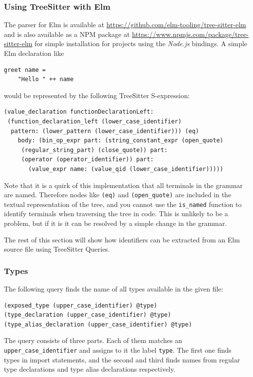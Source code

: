 \documentclass[../thesis.tex]{subfiles}
\begin{document}
\subsubsection{Using TreeSitter with Elm}
The parser for Elm is available at \url{https://github.com/elm-tooling/tree-sitter-elm}
and is also available as a NPM package at \url{https://www.npmjs.com/package/tree-sitter-elm} for simple installation
for projects using the \textit{Node.js} bindings.
A simple Elm declaration like
\begin{verbatim}
greet name = 
    "Hello " ++ name
\end{verbatim}
would be represented by the following TreeSitter S-expression:
\begin{verbatim}
(value_declaration functionDeclarationLeft: 
 (function_declaration_left (lower_case_identifier) 
  pattern: (lower_pattern (lower_case_identifier))) (eq) 
    body: (bin_op_expr part: (string_constant_expr (open_quote) 
     (regular_string_part) (close_quote)) part: 
     (operator (operator_identifier)) part: 
       (value_expr name: (value_qid (lower_case_identifier)))))
\end{verbatim}
Note that it is a quirk of this implementation that all terminals in the grammar are named.
Therefore nodes like \texttt{(eq)} and \texttt{(open\_quote)} are included in
the textual representation of the tree, and you cannot use the \texttt{is\_named} function
to identify terminals when traversing the tree in code.
This is unlikely to be a problem, but if it is it can be resolved by a simple change in the grammar.

The rest of this section will show how identifiers can be extracted from an Elm source file using TreeSitter Queries.

\subsubsection{Types}
The following query finds the name of all types available in the given file:
\begin{verbatim}
(exposed_type (upper_case_identifier) @type)
(type_declaration (upper_case_identifier) @type)
(type_alias_declaration (upper_case_identifier) @type)
\end{verbatim}
The query consists of three parts.
Each of them matches an \texttt{upper\_case\_identifier} and assigns to it the label \texttt{type}.
The first one finds types in import statements, and the second and third finds names from regular type declarations
and type alias declarations respectively.
\end{document}
